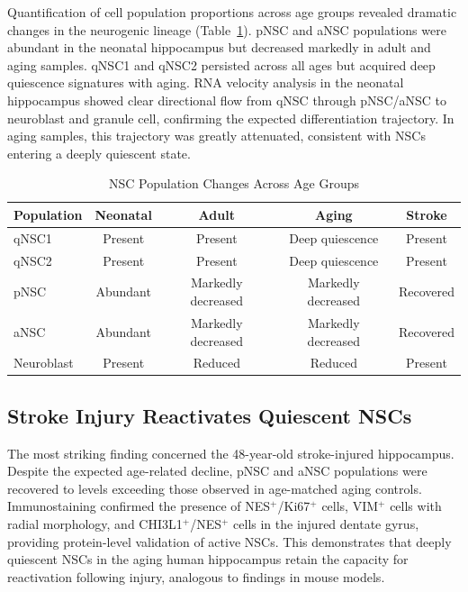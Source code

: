 \documentclass[11pt]{article}
\begin{document}
Quantification of cell population proportions across age groups revealed dramatic changes in the neurogenic lineage (Table~\ref{tab:age}). pNSC and aNSC populations were abundant in the neonatal hippocampus but decreased markedly in adult and aging samples. qNSC1 and qNSC2 persisted across all ages but acquired deep quiescence signatures with aging. RNA velocity analysis in the neonatal hippocampus showed clear directional flow from qNSC through pNSC/aNSC to neuroblast and granule cell, confirming the expected differentiation trajectory. In aging samples, this trajectory was greatly attenuated, consistent with NSCs entering a deeply quiescent state.

\begin{table}[ht]
\centering
\caption{NSC Population Changes Across Age Groups}
\label{tab:age}
\begin{tabular}{lcccc}
\toprule
\textbf{Population} & \textbf{Neonatal} & \textbf{Adult} & \textbf{Aging} & \textbf{Stroke} \\
\midrule
qNSC1 & Present & Present & Deep quiescence & Present \\
qNSC2 & Present & Present & Deep quiescence & Present \\
pNSC & Abundant & Markedly decreased & Markedly decreased & Recovered \\
aNSC & Abundant & Markedly decreased & Markedly decreased & Recovered \\
Neuroblast & Present & Reduced & Reduced & Present \\
\bottomrule
\end{tabular}
\end{table}

\subsection{Stroke Injury Reactivates Quiescent NSCs}

The most striking finding concerned the 48-year-old stroke-injured hippocampus. Despite the expected age-related decline, pNSC and aNSC populations were recovered to levels exceeding those observed in age-matched aging controls. Immunostaining confirmed the presence of NES$^+$/Ki67$^+$ cells, VIM$^+$ cells with radial morphology, and CHI3L1$^+$/NES$^+$ cells in the injured dentate gyrus, providing protein-level validation of active NSCs. This demonstrates that deeply quiescent NSCs in the aging human hippocampus retain the capacity for reactivation following injury, analogous to findings in mouse models.
\end{document}
